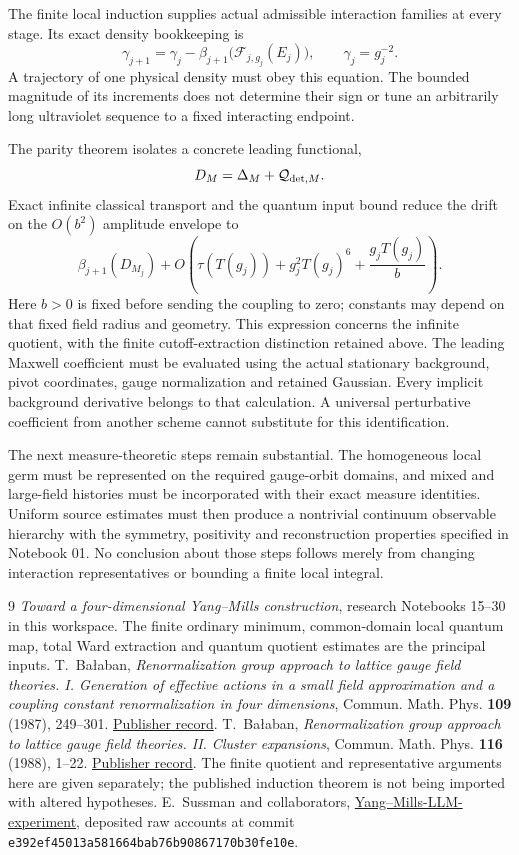 \documentclass[11pt]{article}
\theoremstyle{remark}
\begin{document}
The finite local induction supplies actual admissible interaction
families at every stage. Its exact density bookkeeping is
\[
 \gamma_{j+1}=\gamma_j-
      \beta_{j+1}\bigl(\mathcal F_{j,g_j}(E_j)\bigr),
 \qquad \gamma_j=g_j^{-2}.
\]
A trajectory of one physical density must obey this equation.
The bounded magnitude of its increments does not determine their
sign or tune an arbitrarily long ultraviolet sequence to a fixed
interacting endpoint.

The parity theorem isolates a concrete leading functional,
\[
 D_M=\Delta_M+\mathcal Q_{{\rm det},M}.
\]
Exact infinite classical transport and the quantum input bound
reduce the drift on the \(O(b^2)\) amplitude envelope to
\[
 \beta_{j+1}(D_{M_j})+
 O\!\left(\tau(T(g_j))+g_j^2T(g_j)^6+
                         \frac{g_jT(g_j)}b\right).
\]
Here \(b>0\) is fixed before sending the coupling to zero;
constants may depend on that fixed field radius and geometry.
This expression concerns the infinite quotient, with the
finite cutoff-extraction distinction retained above.
The leading Maxwell coefficient must be evaluated using the actual
stationary background, pivot coordinates, gauge normalization and
retained Gaussian. Every implicit background derivative belongs
to that calculation. A universal perturbative coefficient from
another scheme cannot substitute for this identification.

The next measure-theoretic steps remain substantial. The homogeneous
local germ must be represented on the required gauge-orbit domains,
and mixed and large-field histories must be incorporated with their
exact measure identities. Uniform source estimates must then produce
a nontrivial continuum observable hierarchy with the symmetry,
positivity and reconstruction properties specified in Notebook 01.
No conclusion about those steps follows merely from changing
interaction representatives or bounding a finite local integral.

\begin{thebibliography}{9}
\emph{Toward a four-dimensional Yang--Mills construction},
research Notebooks 15--30 in this workspace. The finite ordinary
minimum, common-domain local quantum map, total Ward extraction
and quantum quotient estimates are the principal inputs.
T.~Ba\l aban,
\emph{Renormalization group approach to lattice gauge field
theories. I. Generation of effective actions in a small field
approximation and a coupling constant renormalization in four
dimensions},
Commun. Math. Phys. \textbf{109} (1987), 249--301.
\href{https://doi.org/10.1007/BF01215223}{Publisher record}.
T.~Ba\l aban,
\emph{Renormalization group approach to lattice gauge field
theories. II. Cluster expansions},
Commun. Math. Phys. \textbf{116} (1988), 1--22.
\href{https://doi.org/10.1007/BF01239022}{Publisher record}.
The finite quotient and representative arguments here are given
separately; the published induction theorem is not being imported
with altered hypotheses.
E.~Sussman and collaborators,
\href{https://github.com/ethanwsussman/Yang--Mills-LLM-experiment}
{Yang--Mills-LLM-experiment}, deposited raw accounts at commit
\texttt{e392ef4501\allowbreak 3a581664ba\allowbreak b76b908671\allowbreak 70b30fe10e}.
\end{thebibliography}
\end{document}
